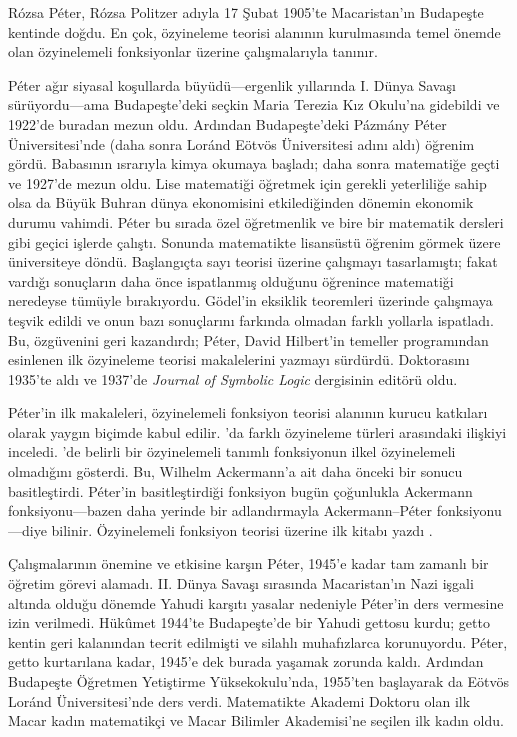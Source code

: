 



 
R\'ozsa P\'eter, R\'ozsa Politzer adıyla 17 Şubat 1905'te Macaristan'ın
Budapeşte kentinde doğdu. En çok, özyineleme teorisi alanının kurulmasında
temel önemde olan özyinelemeli fonksiyonlar üzerine çalışmalarıyla tanınır.

P\'eter ağır siyasal koşullarda büyüdü---ergenlik yıllarında I. Dünya Savaşı
sürüyordu---ama Budapeşte'deki seçkin Maria Terezia Kız Okulu'na gidebildi ve
1922'de buradan mezun oldu. Ardından Budapeşte'deki P\'azm\'any P\'eter
Üniversitesi'nde (daha sonra Lor\'and E\"otv\"os Üniversitesi adını aldı)
öğrenim gördü. Babasının ısrarıyla kimya okumaya başladı; daha sonra
matematiğe geçti ve 1927'de mezun oldu. Lise matematiği öğretmek için gerekli
yeterliliğe sahip olsa da Büyük Buhran dünya ekonomisini etkilediğinden
dönemin ekonomik durumu vahimdi. P\'eter bu sırada özel öğretmenlik ve bire
bir matematik dersleri gibi geçici işlerde çalıştı. Sonunda matematikte
lisansüstü öğrenim görmek üzere üniversiteye döndü. Başlangıçta sayı teorisi
üzerine çalışmayı tasarlamıştı; fakat vardığı sonuçların daha önce ispatlanmış
olduğunu öğrenince matematiği neredeyse tümüyle bırakıyordu. G\"odel'in
eksiklik teoremleri üzerinde çalışmaya teşvik edildi ve onun bazı sonuçlarını
farkında olmadan farklı yollarla ispatladı. Bu, özgüvenini geri kazandırdı;
P\'eter, David Hilbert'in temeller programından esinlenen ilk özyineleme
teorisi makalelerini yazmayı sürdürdü. Doktorasını 1935'te aldı ve 1937'de
\emph{Journal of Symbolic Logic} dergisinin editörü oldu.

P\'eter'in ilk makaleleri, özyinelemeli fonksiyon teorisi alanının kurucu
katkıları olarak yaygın biçimde kabul edilir. \cite{Peter1935a}'da farklı
özyineleme türleri arasındaki ilişkiyi inceledi. \cite{Peter1935b}'de belirli
bir özyinelemeli tanımlı fonksiyonun ilkel özyinelemeli olmadığını gösterdi.
Bu, Wilhelm Ackermann'a ait daha önceki bir sonucu basitleştirdi. P\'eter'in
basitleştirdiği fonksiyon bugün çoğunlukla Ackermann fonksiyonu---bazen daha
yerinde bir adlandırmayla Ackermann--P\'eter fonksiyonu---diye bilinir.
Özyinelemeli fonksiyon teorisi üzerine ilk kitabı yazdı \citep{Peter1951}.

Çalışmalarının önemine ve etkisine karşın P\'eter, 1945'e kadar tam zamanlı
bir öğretim görevi alamadı. II. Dünya Savaşı sırasında Macaristan'ın Nazi
işgali altında olduğu dönemde Yahudi karşıtı yasalar nedeniyle P\'eter'in
ders vermesine izin verilmedi. Hükûmet 1944'te Budapeşte'de bir Yahudi gettosu
kurdu; getto
kentin geri kalanından tecrit edilmişti ve silahlı muhafızlarca korunuyordu.
P\'eter, getto kurtarılana kadar, 1945'e dek burada yaşamak zorunda kaldı.
Ardından Budapeşte Öğretmen Yetiştirme Yüksekokulu'nda, 1955'ten başlayarak da
E\"otv\"os Lor\'and Üniversitesi'nde ders verdi. Matematikte Akademi Doktoru
olan ilk Macar kadın matematikçi ve Macar Bilimler Akademisi'ne seçilen ilk
kadın oldu.

